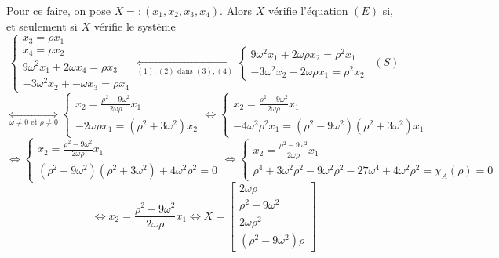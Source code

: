 \documentclass[12pt]{article}
\begin{document}
	Pour ce faire, on pose $X =: (x_1, x_2, x_3, x_4)$. Alors $X$ vérifie l'équation $(E)$ si, et seulement si $X$ vérifie le système
	\begin{equation}
		\begin{cases}
			x_3 = \rho x_1
			\\
			x_4 = \rho x_2
			\\
			9\omega^2 x_1 + 2\omega x_4 = \rho x_3
			\\
			-3\omega^2 x_2 + -\omega x_3 = \rho x_4	
		\end{cases}
		\underset{(1),(2) \text{ dans } (3),(4)}{\iff}
		\begin{cases}
			9\omega^2 x_1 + 2\omega \rho x_2 = \rho^2 x_1
			\\
			-3\omega^2 x_2 - 2\omega \rho x_1 = \rho^2 x_2
		\end{cases}
		\ \ (S)
	\end{equation}
	\begin{equation*}
		\underset{\omega \neq 0 \text{ et } \rho \neq 0}{\iff} 
		\begin{cases}
			x_2 = \frac{\rho^2-9\omega^2}{2\omega \rho}x_1
			\\
			-2\omega \rho x_1 = (\rho^2+3\omega^2)x_2
		\end{cases}
		\iff
		\begin{cases}
		x_2 = \frac{\rho^2-9\omega^2}{2\omega \rho}x_1
		\\
		-4\omega^2 \rho^2 x_1 = (\rho^2-9\omega^2)(\rho^2+3\omega^2)x_1
		\end{cases}
	\end{equation*}
	\begin{equation*}
	\iff
	\begin{cases}
		x_2 = \frac{\rho^2-9\omega^2}{2\omega \rho}x_1
		\\
		(\rho^2-9\omega^2)(\rho^2+3\omega^2)+4\omega^2 \rho^2 = 0
	\end{cases}
	\iff
	\begin{cases}
		x_2 = \frac{\rho^2-9\omega^2}{2\omega \rho}x_1
		\\
		\rho^4 + 3\omega^2\rho^2 - 9\omega^2\rho^2 - 27\omega^4 + 4\omega^2 \rho^2 = \chi_A(\rho) = 0
	\end{cases}
	\end{equation*}
	\begin{equation*}
		\iff x_2 = \frac{\rho^2-9\omega^2}{2\omega \rho}x_1
		\iff
		X = \begin{bmatrix}
			2\omega \rho
			\\ 
			\rho^2-9\omega^2
			\\
			2\omega \rho^2
			\\
			(\rho^2-9\omega^2) \rho
		\end{bmatrix}
	\end{equation*}
	
\end{document}
